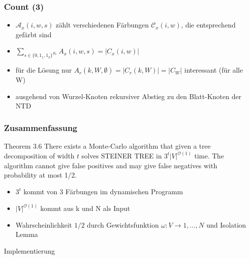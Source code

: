 \documentclass{beamer}
\begin{document}
\begin{frame}
\frametitle{Count (3)}

\begin{itemize}
\pause
\item $\mathcal{A}_x(i,w,s)$ zählt verschiedenen Färbungen $\mathcal{C}_x(i,w)$, die entsprechend gefärbt sind
\pause
\item $\sum\limits_{s \in  \{ 0,1_1,1_2 \}^{B_x} } A_x(i,w,s) = |C_x(i,w)|$
\pause
\item für die Lösung nur $A_r(k,W,\emptyset) = |C_r(k,W)| = |C_W|$ interessant (für alle W)
\pause
\item ausgehend von Wurzel-Knoten rekursiver Abstieg zu den Blatt-Knoten der NTD
\end{itemize}
\end{frame}
\begin{frame}
\frametitle{Zusammenfassung}
\begin{block}{Theorem 3.6}
There exists a Monte-Carlo algorithm that given a tree decomposition of width $t$ solves STEINER TREE in $3^t|V|^{\mathcal{O}(1)}$ time. The algorithm cannot give false positives and may give false negatives with probability at most 1/2.
\end{block}
\begin{itemize}
\pause
\item $3^t$ kommt von 3 Färbungen im dynamischen Programm
\pause
\item $|V|^{\mathcal{O}(1)}$ kommt aus k und N als Input
\pause
\item Wahrscheinlichkeit $1/2$ durch Gewichtsfunktion $\omega:V\rightarrow {1,\dots,N}$ und Isolation Lemma
\end{itemize}
\end{frame}


\begin{frame}
\Huge{\centerline{Implementierung}}
\end{frame}
\end{document}
